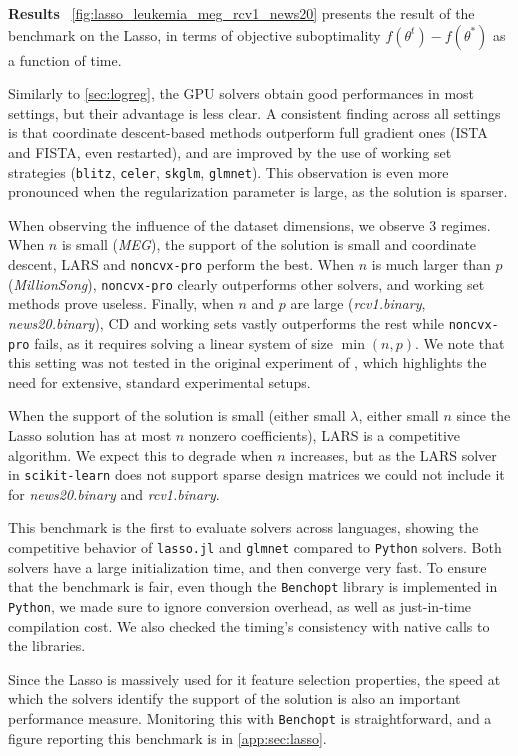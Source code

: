 \documentclass{article}
\newcommand{\Benchopt}{{{\texttt{Benchopt}}}}
\newcommand{\Python}{{{\texttt{Python}}}}
\newcommand{\skglm}{\texttt{skglm}}
\newcommand{\noncvxpro}{\texttt{noncvx-pro}}
\newcommand{\glmnet}{\texttt{glmnet}}
\newcommand{\celer}{{{\texttt{celer}}}}
\newcommand{\blitz}{{{\texttt{blitz}}}}
\newcommand{\lassojl}{{{\texttt{lasso.jl}}}}
\newcommand{\myparagraph}[1]{\vspace{1mm}\noindent\textbf{#1} \,}
\begin{document}
\myparagraph{Results}
\autoref{fig:lasso_leukemia_meg_rcv1_news20} presents the result of the benchmark on the Lasso, in terms of objective suboptimality $f(\theta^t) - f(\theta^*)$ as a function of time.

Similarly to \autoref{sec:logreg}, the GPU solvers obtain good performances in most settings, but their advantage is less clear.
A consistent finding across all settings is that coordinate descent-based methods outperform full gradient ones (ISTA and FISTA, even restarted), and are improved by the use of working set strategies (\blitz{}, \celer{}, \skglm{}, \glmnet{}).
This observation is even more pronounced when the regularization parameter is large, as the solution is sparser.

When observing the influence of the dataset dimensions, we observe 3 regimes.
When $n$ is small (\emph{MEG}), the support of the solution is small and coordinate descent, LARS and \noncvxpro{} perform the best.
When $n$ is much larger than $p$ (\emph{MillionSong}), \noncvxpro{} clearly outperforms other solvers, and working set methods prove useless.
Finally, when $n$ and $p$ are large (\emph{rcv1.binary}, \emph{news20.binary}), CD and working sets vastly outperforms the rest while \noncvxpro{} fails, as it requires solving a linear system of size $\min(n, p)$.
We note that this setting was not tested in the original experiment of \citet{Poon_21}, which highlights the need for extensive, standard experimental setups.

When the support of the solution is small (either small $\lambda$, either small $n$ since the Lasso solution has at most $n$ nonzero coefficients), LARS is a competitive algorithm.
We expect this to degrade when $n$ increases, but as the LARS solver in \texttt{scikit-learn} does not support sparse design matrices we could not include it for \emph{news20.binary} and \emph{rcv1.binary}.

This benchmark is the first to evaluate solvers across languages, showing the competitive behavior of \lassojl{} and \glmnet{} compared to \Python{} solvers.
Both solvers have a large initialization time, and then converge very fast.
To ensure that the benchmark is fair, even though the \Benchopt{} library is implemented in \Python{}, we made sure to ignore conversion overhead, as well as just-in-time compilation cost.
We also checked the timing's consistency with native calls to the libraries.

Since the Lasso is massively used for it feature selection properties, the speed at which the solvers identify the support of the solution is also an important performance measure.
Monitoring this with \Benchopt{} is straightforward, and a figure reporting this benchmark is in \autoref{app:sec:lasso}. \newcommand{\weights}{\theta}
\newcommand{\cmark}{\ding{51}}\newcommand{\xmark}{\ding{55}}
\end{document}
